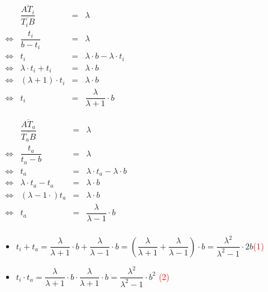 \begin{small}
\begin{Beweis}
\begin{enumerate}
      \begin{minipage}[t]{0.5\textwidth}
        $\begin{array}{rccl}
          & \dfrac{\overline{AT_{i}}}{\overline{T_{i}B}} & = & \lambda \\
          \Leftrightarrow & \dfrac{t_{i}}{b-t_{i}} & = & \lambda \\
          \Leftrightarrow & t_{i} & = & \lambda \cdot b - \lambda \cdot t_{i} \\
          \Leftrightarrow & \lambda \cdot t_{i} + t_{i} & = & \lambda \cdot b \\
          \Leftrightarrow & (\lambda + 1)\cdot t_{i} & = & \lambda \cdot b \\
          \Leftrightarrow & t_{i} & = & \dfrac {\lambda}{\lambda +1}\cdot b 
        \end{array}$
        \end{minipage}
        \begin{minipage}[t]{0.5\textwidth}
        $\begin{array}{rccl}
          & \dfrac{\overline{AT_{a}}}{\overline{T_{a}B}} & = & \lambda \\
          \Leftrightarrow & \dfrac{t_{a}}{t_{a}-b} & = & \lambda \\
          \Leftrightarrow & t_{a} & = & \lambda \cdot t_{a} - \lambda \cdot b \\
          \Leftrightarrow & \lambda \cdot t_{a} - t_{a} & = & \lambda \cdot b \\
          \Leftrightarrow & (\lambda -1 \cdot )t_{a} & = & \lambda \cdot b \\
          \Leftrightarrow & t_{a} & = & \dfrac{\lambda}{\lambda -1}\cdot b \\
        \end{array}$
      \end{minipage}

      \begin{itemize}
        \item
        $t_{i} + t_{a} = \dfrac {\lambda}{\lambda +1}\cdot b + \dfrac {\lambda}{\lambda -1}\cdot b  =(\dfrac{\lambda}{\lambda+1} + \dfrac{\lambda}{\lambda-1})\cdot b=\dfrac{\lambda^2}{\lambda^2 -1}\cdot 2b $\qquad \textcolor{red}{(1)}
        \item
        $t_{i} \cdot t_{a} =\dfrac {\lambda}{\lambda +1}\cdot b \cdot \dfrac {\lambda}{\lambda +1}\cdot b =\dfrac{\lambda^2}{\lambda^2 -1}\cdot b^2$ \qquad \textcolor{red}{(2)}
      \end{itemize}


\end{enumerate}
\end{Beweis}
\end{small}

